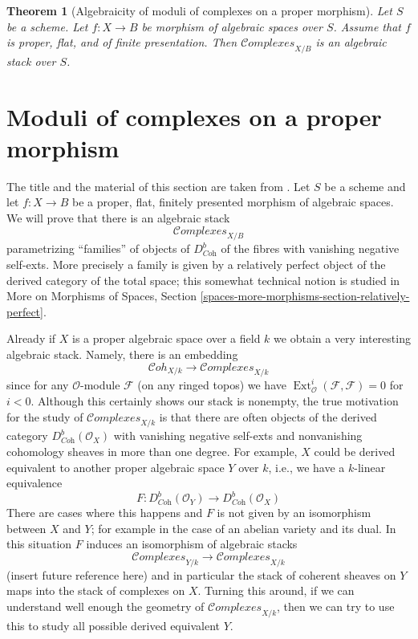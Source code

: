 \documentclass[10pt,a4paper]{amsart}
\theoremstyle{plain}
\newtheorem{theorem}[subsection]{Theorem}
\theoremstyle{definition}
\theoremstyle{remark}
\numberwithin{equation}{subsection}
\def\Ext{\mathop{\mathrm{Ext}}\nolimits}
\def\Cohstack{\mathcal{C}\!\mathit{oh}}
\def\Complexesstack{\mathcal{C}\!\mathit{omplexes}}
\newenvironment{reference}{}{}
\begin{document}
\begin{theorem}[Algebraicity of moduli of complexes on a proper morphism]
\label{theorem-complexes-algebraic}
\begin{reference}
\cite{lieblich-complexes}
\end{reference}
Let $S$ be a scheme. Let $f : X \to B$ be morphism of algebraic spaces
over $S$. Assume that $f$ is proper, flat, and of finite presentation.
Then $\Complexesstack_{X/B}$ is an algebraic stack over $S$.
\end{theorem}

\section{Moduli of complexes on a proper morphism}
\label{section-moduli-complexes}

\noindent
The title and the material of this section are taken from
\cite{lieblich-complexes}. Let $S$ be a scheme and let
$f : X \to B$ be a proper, flat, finitely presented morphism
of algebraic spaces. We will prove that there is an
algebraic stack
$$
\Complexesstack_{X/B}
$$
parametrizing ``families'' of objects of $D^b_{\textit{Coh}}$
of the fibres with vanishing negative self-exts. More precisely
a family is given by a relatively perfect object of the derived
category of the total space; this somewhat technical notion
is studied in
More on Morphisms of Spaces, Section
\ref{spaces-more-morphisms-section-relatively-perfect}.

\medskip\noindent
Already if $X$ is a proper algebraic
space over a field $k$ we obtain a very interesting algebraic stack.
Namely, there is an embedding
$$
\Cohstack_{X/k} \longrightarrow \Complexesstack_{X/k}
$$
since for any $\mathcal{O}$-module $\mathcal{F}$ (on any ringed topos)
we have $\Ext^i_\mathcal{O}(\mathcal{F}, \mathcal{F}) = 0$ for $i < 0$.
Although this certainly shows our stack is nonempty, the
true motivation for the study of $\Complexesstack_{X/k}$
is that there are often objects of the derived category
$D^b_{\textit{Coh}}(\mathcal{O}_X)$ with vanishing negative self-exts
and nonvanishing cohomology sheaves in more than one degree.
For example, $X$ could be derived equivalent to another
proper algebraic space $Y$ over $k$, i.e., we have a
$k$-linear equivalence
$$
F : D^b_{\textit{Coh}}(\mathcal{O}_Y)
\longrightarrow
D^b_{\textit{Coh}}(\mathcal{O}_X)
$$
There are cases where this happens and $F$ is not given by
an isomorphism between $X$ and $Y$; for example in the case
of an abelian variety and its dual. In this situation $F$ induces
an isomorphism of algebraic stacks
$$
\Complexesstack_{Y/k}
\longrightarrow
\Complexesstack_{X/k}
$$
(insert future reference here) and in particular the stack of coherent sheaves
on $Y$ maps into the stack of complexes on $X$. Turning this around,
if we can understand well enough the geometry of
$\Complexesstack_{X/k}$, then we can try to use this to study all possible
derived equivalent $Y$.
\end{document}
